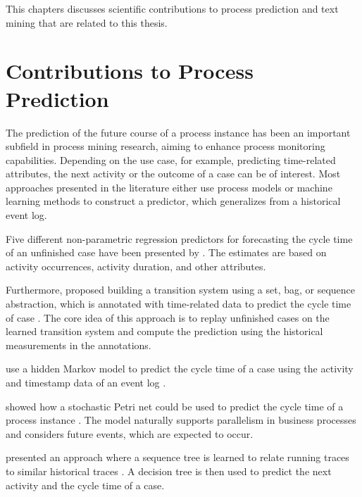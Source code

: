 This chapters discusses scientific contributions to process prediction and text mining that are related to this thesis.

\section{Contributions to Process Prediction}

The prediction of the future course of a process instance has been an important subfield in process mining research, aiming to enhance process monitoring capabilities.
Depending on the use case, for example, predicting time-related attributes, the next activity or the outcome of a case can be of interest.
Most approaches presented in the literature either use process models or machine learning methods to construct a predictor, which generalizes from a historical event log.

Five different non-parametric regression predictors for forecasting the cycle time of an unfinished case have been presented by  \cite{DBLP:conf/otm/DongenCA08}.
The estimates are based on activity occurrences, activity duration, and other attributes.

Furthermore,  proposed building a transition system using a set, bag, or sequence abstraction, which is annotated with time-related data to predict the cycle time of case \cite{DBLP:journals/is/AalstSS11}.
The core idea of this approach is to replay unfinished cases on the learned transition system and compute the prediction using the historical measurements in the annotations.

\citeauthor{DBLP:conf/colcom/PandeyNC11} use a hidden Markov model to predict the cycle time of a case using the activity and timestamp data of an event log \cite{DBLP:conf/colcom/PandeyNC11}.

\citeauthor{DBLP:conf/icsoc/Rogge-SoltiW13} showed how a stochastic Petri net could be used to predict the cycle time of a process instance \cite{DBLP:conf/icsoc/Rogge-SoltiW13}.
The model naturally supports parallelism in business processes and considers future events, which are expected to occur. 

\citeauthor{DBLP:conf/dis/CeciLFCM14} presented an approach where a sequence tree is learned to relate running traces to similar historical traces \cite{DBLP:conf/dis/CeciLFCM14}.
A decision tree is then used to predict the next activity and the cycle time of a case.

